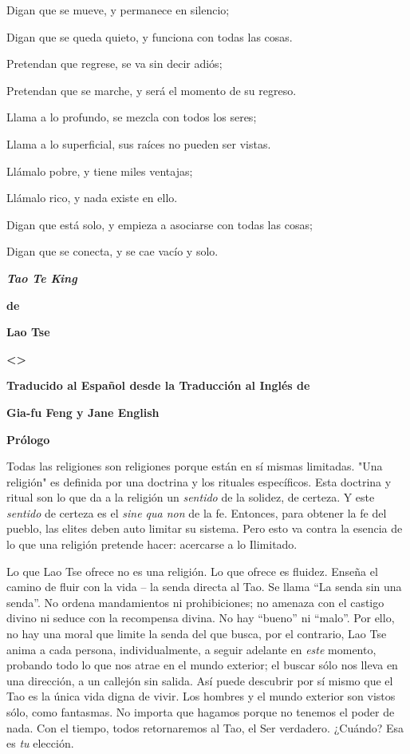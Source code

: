 Digan que se mueve, y permanece en silencio;

Digan que se queda quieto, y funciona con todas las cosas.

Pretendan que regrese, se va sin decir adiós;

Pretendan que se marche, y será el momento de su regreso.

Llama a lo profundo, se mezcla con todos los seres;

Llama a lo superficial, sus raíces no pueden ser vistas.

Llámalo pobre, y tiene miles ventajas;

Llámalo rico, y nada existe en ello.

Digan que está solo, y empieza a asociarse con todas las cosas;

Digan que se conecta, y se cae vacío y solo.

\emph{\textbf{Tao Te King}}

\textbf{de}

\textbf{Lao Tse}

\textbf{\textless\textgreater{}}

\textbf{Traducido al Español desde la Traducción al Inglés de}

\textbf{Gia-fu Feng y Jane English}

\textbf{Prólogo}

Todas las religiones son religiones porque están en sí mismas limitadas.
"Una religión" es definida por una doctrina y los rituales específicos.
Esta doctrina y ritual son lo que da a la religión un \emph{sentido} de
la solidez, de certeza. Y este \emph{sentido} de certeza es el
\emph{sine qua non} de la fe. Entonces, para obtener la fe del pueblo,
las elites deben auto limitar su sistema. Pero esto va contra la esencia
de lo que una religión pretende hacer: acercarse a lo Ilimitado.

Lo que Lao Tse ofrece no es una religión. Lo que ofrece es fluidez.
Enseña el camino de fluir con la vida -- la senda directa al Tao. Se
llama ``La senda sin una senda''. No ordena mandamientos ni
prohibiciones; no amenaza con el castigo divino ni seduce con la
recompensa divina. No hay ``bueno'' ni ``malo''. Por ello, no hay una
moral que limite la senda del que busca, por el contrario, Lao Tse anima
a cada persona, individualmente, a seguir adelante en \emph{este}
momento, probando todo lo que nos atrae en el mundo exterior; el buscar
sólo nos lleva en una dirección, a un callejón sin salida. Así puede
descubrir por sí mismo que el Tao es la única vida digna de vivir. Los
hombres y el mundo exterior son vistos sólo, como fantasmas. No importa
que hagamos porque no tenemos el poder de nada. Con el tiempo, todos
retornaremos al Tao, el Ser verdadero. ¿Cuándo? Esa es \emph{tu}
elección.

